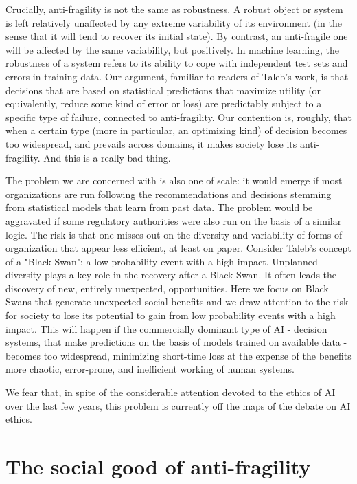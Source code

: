\documentclass[conference]{IEEEtran}
\begin{document}
Crucially, anti-fragility is not the same as robustness. A robust object or system is left relatively unaffected by any extreme variability of its environment (in the sense that it will tend to recover its initial state). By contrast, an anti-fragile one will be affected by the same variability, but positively. In machine learning, the robustness of a system refers to its ability to cope with independent test sets and errors in training data. Our argument, familiar to readers of Taleb's work, is that decisions that are based on statistical predictions that maximize utility (or equivalently, reduce some kind of error or loss) are predictably subject to a specific type of failure, connected to anti-fragility. Our contention is, roughly, that when a certain type (more in particular, an optimizing kind) of decision becomes too widespread, and prevails across domains, it makes society lose its anti-fragility. And this is a really bad thing.%

The problem we are concerned with is also one of scale: it would emerge if most organizations are run following the recommendations and decisions stemming from statistical models that learn from past data. The problem would be aggravated if some regulatory authorities were also run on the basis of a similar logic. The risk is that one misses out on the diversity and variability of forms of organization that appear less efficient, at least on paper. Consider Taleb's concept of a "Black Swan": a low probability event with a high impact\cite{Taleb:Black:2007}. Unplanned diversity plays a key role in the recovery after a Black Swan. It often leads the discovery of new, entirely unexpected, opportunities. Here we focus on Black Swans that generate unexpected social benefits and we draw attention to the risk for society to lose its potential to gain from low probability events with a high impact. This will happen if the commercially dominant type of AI - decision systems, that make predictions on the basis of models trained on available data - becomes too widespread,  minimizing short-time loss at the expense of the benefits more chaotic, error-prone, and inefficient working of human systems.
 
We fear that, in spite of the considerable attention devoted to the ethics of AI over the last few years, this problem is currently off the maps of the debate on AI ethics.

\section{The social good of anti-fragility}
\end{document}
